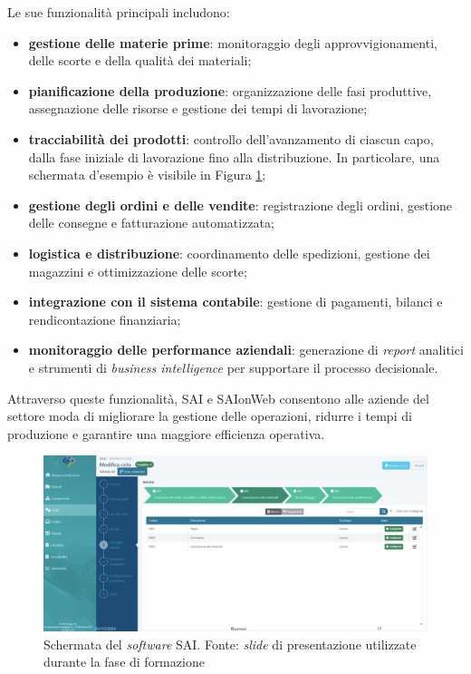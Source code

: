         \vspace{0.2 em}
        \noindent Le sue funzionalità principali includono:  
        \begin{itemize}
            \item \textbf{gestione delle materie prime}: monitoraggio degli approvvigionamenti, delle scorte e della qualità dei materiali;
            \item \textbf{pianificazione della produzione}: organizzazione delle fasi produttive, assegnazione delle risorse e gestione dei tempi di lavorazione;
            \item \textbf{tracciabilità dei prodotti}: controllo dell’avanzamento di ciascun capo, dalla fase iniziale di lavorazione fino alla distribuzione. In particolare, una schermata d'esempio è visibile in Figura \ref{fig:screenSAI};
            \item \textbf{gestione degli ordini e delle vendite}: registrazione degli ordini, gestione delle consegne e fatturazione automatizzata;
            \item \textbf{logistica e distribuzione}: coordinamento delle spedizioni, gestione dei magazzini e ottimizzazione delle scorte;
            \item \textbf{integrazione con il sistema contabile}: gestione di pagamenti, bilanci e rendicontazione finanziaria;
            \item \textbf{monitoraggio delle performance aziendali}: generazione di \textit{report} analitici e strumenti di \textit{business intelligence} per supportare il processo decisionale.  
        \end{itemize}

        \vspace{0.2 em}
        \noindent Attraverso queste funzionalità, SAI e SAIonWeb consentono alle aziende del settore moda di migliorare la gestione delle operazioni, ridurre i tempi di produzione e garantire una maggiore efficienza operativa.

        \begin{figure}[H]
            \centering
            \includegraphics[width=1.0\linewidth]{BCS-Tessi//images/schermata_SAI.png}
            \caption[Schermata del \textit{software} SAI di SogeaSoft S.r.l.]{Schermata del \textit{software} SAI. Fonte: \textit{slide} di presentazione utilizzate durante la fase di formazione}
            \label{fig:screenSAI}
        \end{figure}
        
